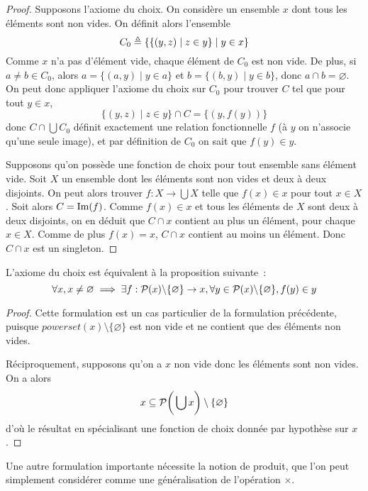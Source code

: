 \begin{proof}
  Supposons l'axiome du choix. On considère un ensemble $x$ dont tous les
  éléments sont non vides. On définit alors l'ensemble
  \[C_0\triangleq \{\{(y,z)\mid z \in y\}\mid y \in x\}\]
  Comme $x$ n'a pas d'élément vide, chaque élément de $C_0$ est non vide. De
  plus, si $a \neq b \in C_0$, alors
  $a = \{(a,y)\mid y \in a\}$ et $b = \{(b,y)\mid y \in b\}$, donc
  $a\cap b = \varnothing$. On peut donc appliquer l'axiome du choix sur
  $C_0$ pour trouver $C$ tel que pour tout $y\in x$,
  \[\{(y,z)\mid z \in y\}\cap C = \{(y,f(y))\}\]
  donc $C\cap \bigcup C_0$ définit exactement une relation fonctionnelle $f$
  (à $y$ on n'associe qu'une seule image), et par définition de $C_0$ on sait
  que $f(y)\in y$.

  Supposons qu'on possède une fonction de choix pour tout ensemble sans élément
  vide. Soit $X$ un ensemble dont les éléments sont non vides et deux à deux
  disjoints. On peut alors trouver $f : X \to \bigcup X$ telle que $f(x)\in x$
  pour tout $x\in X$. Soit alors $C = \operatorname{Im}(f)$. Comme $f(x)\in x$ et tous les
  éléments de $X$ sont deux à deux disjoints, on en déduit que $C\cap x$
  contient au plus un élément, pour chaque $x\in X$. Comme de plus
  $f(x) = x$, $C\cap x$ contient au moins un élément. Donc $C\cap x$ est un
  singleton.
\end{proof}

\begin{proposition}
  L'axiome du choix est équivalent à la proposition suivante~:
  \[\forall x, x\neq\varnothing\implies
  \exists f : \mathcal{P} (x) \backslash \{\varnothing\} \to x,
  \forall y \in \mathcal{P}(x)\backslash \{\varnothing\}, f(y)\in y\]
\end{proposition}

\begin{proof}
  Cette formulation est un cas particulier de la formulation précédente, puisque
  $powerset(x)\setminus\{\varnothing\}$ est non vide et ne contient que des
  éléments non vides.

  Réciproquement, supposons qu'on a $x$ non vide donc les éléments sont non
  vides. On a alors
  \[x\subseteq \mathcal{P}\bigg(\bigcup x\bigg)\setminus\{\varnothing\}\]
  d'où le résultat en spécialisant une fonction de choix donnée par hypothèse
  sur $x$.
\end{proof}

Une autre formulation importante nécessite la notion de produit, que l'on peut
simplement considérer comme une généralisation de l'opération $\times$.

